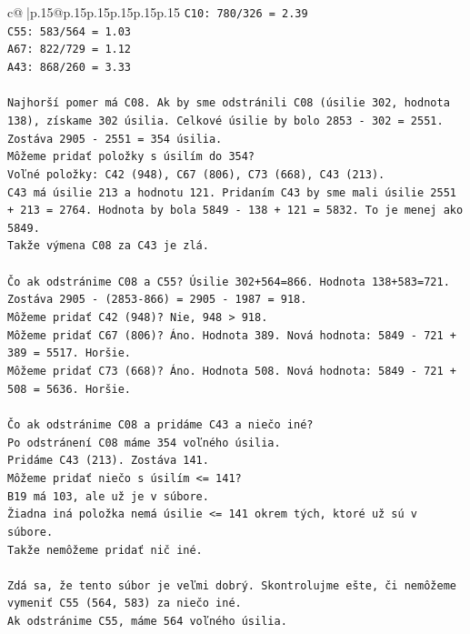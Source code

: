 \documentclass{article}
\begin{document}
{\begin{supertabular}{c@{$\;$}|p{.15\linewidth}@{}p{.15\linewidth}p{.15\linewidth}p{.15\linewidth}p{.15\linewidth}p{.15\linewidth}}
{{{\texttt{C10: 780/326 = 2.39} \\
\texttt{C55: 583/564 = 1.03} \\
\texttt{A67: 822/729 = 1.12} \\
\texttt{A43: 868/260 = 3.33} \\
\\ 
\texttt{Najhorší pomer má C08. Ak by sme odstránili C08 (úsilie 302, hodnota 138), získame 302 úsilia. Celkové úsilie by bolo 2853 {-} 302 = 2551. Zostáva 2905 {-} 2551 = 354 úsilia.} \\
\texttt{Môžeme pridať položky s úsilím do 354?} \\
\texttt{Voľné položky: C42 (948), C67 (806), C73 (668), C43 (213).} \\
\texttt{C43 má úsilie 213 a hodnotu 121. Pridaním C43 by sme mali úsilie 2551 + 213 = 2764. Hodnota by bola 5849 {-} 138 + 121 = 5832. To je menej ako 5849.} \\
\texttt{Takže výmena C08 za C43 je zlá.} \\
\\ 
\texttt{Čo ak odstránime C08 a C55? Úsilie 302+564=866. Hodnota 138+583=721. Zostáva 2905 {-} (2853{-}866) = 2905 {-} 1987 = 918.} \\
\texttt{Môžeme pridať C42 (948)? Nie, 948 > 918.} \\
\texttt{Môžeme pridať C67 (806)? Áno. Hodnota 389. Nová hodnota: 5849 {-} 721 + 389 = 5517. Horšie.} \\
\texttt{Môžeme pridať C73 (668)? Áno. Hodnota 508. Nová hodnota: 5849 {-} 721 + 508 = 5636. Horšie.} \\
\\ 
\texttt{Čo ak odstránime C08 a pridáme C43 a niečo iné?} \\
\texttt{Po odstránení C08 máme 354 voľného úsilia.} \\
\texttt{Pridáme C43 (213). Zostáva 141.} \\
\texttt{Môžeme pridať niečo s úsilím <= 141?} \\
\texttt{B19 má 103, ale už je v súbore.} \\
\texttt{Žiadna iná položka nemá úsilie <= 141 okrem tých, ktoré už sú v súbore.} \\
\texttt{Takže nemôžeme pridať nič iné.} \\
\\ 
\texttt{Zdá sa, že tento súbor je veľmi dobrý. Skontrolujme ešte, či nemôžeme vymeniť C55 (564, 583) za niečo iné.} \\
\texttt{Ak odstránime C55, máme 564 voľného úsilia.} \\
}}}
\end{supertabular}}
\end{document}
